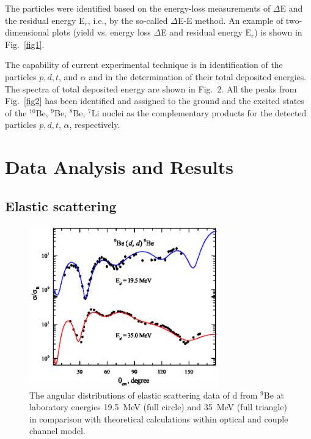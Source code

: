 \documentclass[10pt]{iopart}
\begin{document}
The particles were identified based on the energy-loss measurements of $\Delta$E and the residual energy E$_r$, i.e., by the so-called $\Delta$E-E method. An example of two-dimensional plots (yield vs. energy loss $\Delta$E and residual energy E$_r$) is shown in Fig.~\ref{fig1}.

The capability of current experimental technique is in identification of the particles $p, d, t$, and $\alpha$ and in the determination of their total deposited energies. The spectra of total deposited energy are shown in Fig.~2. All the peaks from Fig.~\ref{fig2} has been identified and assigned to the ground and the excited states of the $^{10}$Be, $^9$Be, $^8$Be, $^7$Li nuclei as the complementary products for the detected particles $p, d, t$, $\alpha$, respectively.

\section{Data Analysis and Results }
\subsection{Elastic scattering}

\begin{figure}[tp]
\centering
\includegraphics[width=8.2cm]{2H9BE.eps}
\caption{ \label{2H9BE}  \footnotesize The angular distributions of elastic scattering data of d from $^9$Be at laboratory energies 19.5~MeV (full circle) and 35~MeV (full triangle) in comparison with theoretical calculations within optical and couple channel model.}
\end{figure}
\end{document}
